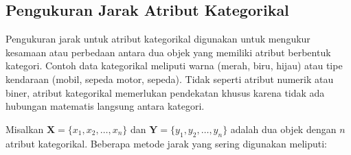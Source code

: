 \documentclass[
  oneside]{book}
\newenvironment{Shaded}{\begin{snugshade}}{\end{snugshade}}
\newcommand{\AttributeTok}[1]{\textcolor[rgb]{0.13,0.29,0.53}{#1}}
\newcommand{\CommentTok}[1]{\textcolor[rgb]{0.56,0.35,0.01}{\textit{#1}}}
\newcommand{\DecValTok}[1]{\textcolor[rgb]{0.00,0.00,0.81}{#1}}
\newcommand{\FunctionTok}[1]{\textcolor[rgb]{0.13,0.29,0.53}{\textbf{#1}}}
\newcommand{\NormalTok}[1]{#1}
\newcommand{\OtherTok}[1]{\textcolor[rgb]{0.56,0.35,0.01}{#1}}
\begin{document}
\begin{Shaded}
\end{Shaded}

\subsection{Pengukuran Jarak Atribut Kategorikal}\label{pengukuran-jarak-atribut-kategorikal}

Pengukuran jarak untuk atribut kategorikal digunakan untuk mengukur kesamaan atau perbedaan antara dua objek yang memiliki atribut berbentuk kategori. Contoh data kategorikal meliputi warna (merah, biru, hijau) atau tipe kendaraan (mobil, sepeda motor, sepeda). Tidak seperti atribut numerik atau biner, atribut kategorikal memerlukan pendekatan khusus karena tidak ada hubungan matematis langsung antara kategori.

Misalkan \(\mathbf{X} = \{x_1, x_2, \dots, x_n\}\) dan \(\mathbf{Y} = \{y_1, y_2, \dots, y_n\}\) adalah dua objek dengan \(n\) atribut kategorikal. Beberapa metode jarak yang sering digunakan meliputi:
\end{document}
